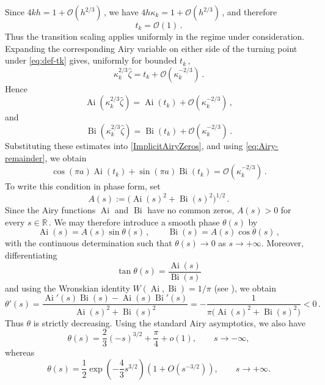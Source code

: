 \documentclass[11pt]{amsart}
\numberwithin{equation}{section}
\theoremstyle{remark}
\newcommand{\Ai}{\operatorname{Ai}}
\newcommand{\Bi}{\operatorname{Bi}}
\begin{document}
Since $4kh=1+\mathcal O(h^{2/3})\,$, we have
$4h\kappa_k=1+\mathcal O(h^{2/3})\,$, and therefore
\[
t_k=\mathcal O(1)\,.
\]
Thus the transition scaling applies uniformly in the regime under consideration.
Expanding the corresponding Airy variable on either side of the
turning point under \eqref{eq:def-tk} gives, uniformly for bounded
$t_k\,$,
\begin{equation}\label{eq:Airy-variable-transition}
	\kappa_k^{2/3}\widehat\zeta
	=
	t_k+\mathcal O(\kappa_k^{-2/3})\,.
\end{equation}
Hence
\[
	\Ai(\kappa_k^{2/3}\widehat\zeta)
	=
	\Ai(t_k)+\mathcal O(\kappa_k^{-2/3})\,,
\]
and
\[
	\Bi(\kappa_k^{2/3}\widehat\zeta)
	=
	\Bi(t_k)+\mathcal O(\kappa_k^{-2/3})\,.
\]
Substituting these estimates into \eqref{ImplicitAiryZeros}, and using
\eqref{eq:Airy-remainder}, we obtain
\begin{equation}\label{eq:Airy-transition-quantization}
	\cos(\pi a)\Ai(t_k)
	+
	\sin(\pi a)\Bi(t_k)
	=
	\mathcal O(\kappa_k^{-2/3})\,.
\end{equation}
To write this condition in phase form, set
\[
	A(s):=\bigl(\Ai(s)^2+\Bi(s)^2\bigr)^{1/2}\,.
\]
Since the Airy functions $\Ai$ and $\Bi$ have no common zeros,
$A(s)>0$ for every $s\in\mathbb R\,$. We may therefore introduce a smooth phase $\theta(s)$ by
\begin{equation}\label{eq:Airy-phase}
	\Ai(s)=A(s)\sin\theta(s)\,,
	\qquad
	\Bi(s)=A(s)\cos\theta(s)\,,
\end{equation}
with the continuous determination such that $\theta(s)\to0$ as $s\to+\infty$.
Moreover, differentiating
\[
\tan\theta(s)=\frac{\Ai(s)}{\Bi(s)}
\]
and using the Wronskian identity
$W(\Ai,\Bi)=1/\pi$ (see \cite[Eq.~(9.2.7)]{DLMF}), we obtain
\begin{equation}\label{eq:Airy-phase-derivative}
	\theta'(s)
	=
	\frac{\Ai'(s)\Bi(s)-\Ai(s)\Bi'(s)}
	{\Ai(s)^2+\Bi(s)^2}
	=
	-\frac{1}{\pi\bigl(\Ai(s)^2+\Bi(s)^2\bigr)}
	<0\,.
\end{equation}
Thus $\theta$ is strictly decreasing.  Using the standard Airy asymptotics, we also have
\[
\theta(s)
=
\frac23(-s)^{3/2}+\frac{\pi}{4}+o(1),
\qquad s\to-\infty,
\]
whereas
\[
\theta(s)
=
\frac12\exp\left(-\frac43s^{3/2}\right)
\left(1+O(s^{-3/2})\right),
\qquad s\to+\infty.
\]
%
%
\end{document}
